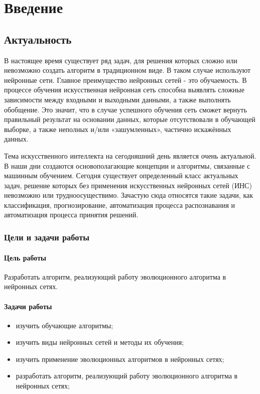 \newpage

\chapter*{Введение}
\section*{Актуальность}

\indent\indent 
В настоящее время существует ряд задач, для решения которых сложно или невозможно создать алгоритм в традиционном виде. В таком случае используют нейронные сети. Главное преимущество нейронных сетей - это обучаемость. В процессе
обучения искусственная нейронная сеть способна выявлять сложные зависимости
между входными и выходными данными, а также выполнять обобщение. Это
значит, что в случае успешного обучения сеть сможет вернуть правильный
результат на основании данных, которые отсутствовали в обучающей выборке, а
также неполных и/или «зашумленных», частично искажённых данных.

Тема искусственного интеллекта на сегодняшний день является 
очень актуальной. В наши дни создаются основополагающие 
концепции и алгоритмы, связанные с машинным обучением.  
Сегодня существует определенный класс актуальных задач, 
решение которых без применения искусственных нейронных 
сетей (ИНС) невозможно или трудноосуществимо. Зачастую 
сюда относятся такие задачи, как классификация, 
прогнозирование, автоматизация процесса распознавания и автоматизация процесса принятия решений.

\subsection*{Цели и задачи работы}
\subsubsection*{Цель работы}

\indent\indent  Разработать алгоритм, реализующий работу эволюционного алгоритма в нейронных сетях.

\subsubsection*{Задачи работы}
\begin{itemize}
	\item изучить обучающие алгоритмы;
	\item изучить виды нейронных сетей и методы их обучения;
	\item изучить применение эволюционных алгоритмов в нейронных сетях;
	\item разработать алгоритм, реализующий работу эволюционного 
  алгоритма в нейронных сетях;
\end{itemize}


